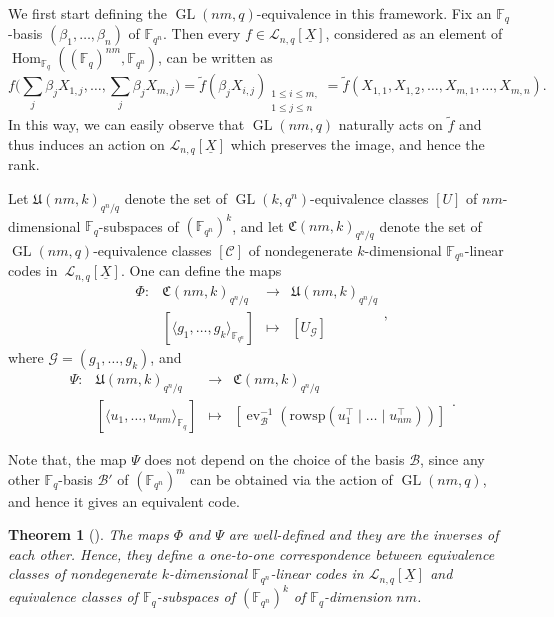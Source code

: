 \documentclass[11pt]{article}
\newtheorem{theorem}[theo]{Theorem}
\theoremstyle{definition}
\numberwithin{equation}{section}
\DeclareMathOperator{\GL}{GL}
\DeclareMathOperator{\ev}{ev}
\DeclareMathOperator{\Hom}{Hom}
\begin{document}
We first start defining the $\GL(nm,q)$-equivalence in this framework. Fix an $\mathbb{F}_q$-basis $(\beta_1,\ldots,\beta_n)$ of ${\mathbb F}_{q^n}$. Then every $f\in\mathcal{L}_{n,q}[\underline{X}]$, considered as an element of  $\Hom_{\mathbb{F}_q}((\mathbb{F}_q)^{nm},{\mathbb F}_{q^n})$, can be written as  
{\small $$f\Big(\sum_{j}\beta_jX_{1,j},\ldots, \sum_{j}\beta_jX_{m,j}\Big)=\tilde{f}(\beta_jX_{i,j})_{\substack{1\leq i \leq m,\\ 1 \leq j \leq n}}=\tilde{f}(X_{1,1},X_{1,2},\ldots,X_{m,1},\ldots,X_{m,n}).$$}
In this way, we can easily observe that $\GL(nm,q)$ naturally acts on $\tilde{f}$ and  thus induces an action on $\mathcal{L}_{n,q}[\underline{X}]$ which preserves the image, and hence the rank. 

Let $\mathfrak  U(nm,k)_{q^n/q}$ denote the set of $\GL(k,q^n)$-equivalence classes $[U]$ of $nm$-dimensional $\mathbb{F}_q$-subspaces of $(\mathbb{F}_{q^n})^k$, and let $\mathfrak  C(nm,k)_{q^n/q}$ denote the set of $\GL(nm,q)$-equivalence classes $[\mathcal{C}]$ of nondegenerate $k$-dimensional ${\mathbb F}_{q^n}$-linear codes in~$\mathcal{L}_{n,q}[\underline{X}]$. One can define the maps
 $$\begin{array}{rccc}\Phi: & \mathfrak  C(nm,k)_{q^n/q} &\longrightarrow &\mathfrak  U(nm,k)_{q^n/q}\\
 & [\langle g_1,\ldots,g_k\rangle_{{\mathbb F}_{q^n}}] & \longmapsto & [U_{\mathcal G}] \end{array}, $$
where $\mathcal G=(g_1,\ldots,g_k)$,
and 
 $$\begin{array}{rccc}\Psi: & \mathfrak  U(nm,k)_{q^n/q} &\longrightarrow &\mathfrak  C(nm,k)_{q^n/q} \\
 & [\langle u_1, \ldots, u_{nm}\rangle_{\mathbb{F}_q}] & \longmapsto & [\ev_{\mathcal{B}}^{-1}(\mathrm{rowsp}( u_1^\top \mid \ldots \mid u_{nm}^\top))] \end{array}.$$

Note that, the map $\Psi$ does not depend on the choice of the basis $\mathcal{B}$, since any other $\mathbb{F}_q$-basis $\mathcal{B}'$ of $({\mathbb F}_{q^n})^m$ can be obtained via the action of $\GL(nm,q)$, and hence it gives an equivalent code.

 \begin{theorem}[\textnormal{\cite{randrianarisoa2020geometric}}]\label{thm:correspondence_codes_systems}
  The maps $\Phi$ and $\Psi$ are well-defined and they are the inverses of each other. Hence, they define a one-to-one correspondence between equivalence classes of nondegenerate $k$-dimensional ${\mathbb F}_{q^n}$-linear codes in $\mathcal{L}_{n,q}[\underline{X}]$ and equivalence classes of $\mathbb{F}_q$-subspaces of $(\mathbb{F}_{q^n})^k$ of $\mathbb{F}_q$-dimension $nm$.
 \end{theorem}
\end{document}
